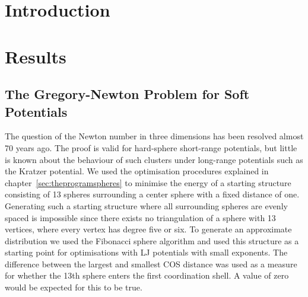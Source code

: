 \section{Introduction}
\label{sec:introductiongregorynewton}

\section{Results}
\label{sec:resultsgregorynewton}

\subsection{The Gregory-Newton Problem for Soft Potentials}
\label{sec:thegregorynewtonproblemforsoftpotentials}

The question of the Newton number in three dimensions has been resolved almost
70 years ago\autocite{Schutte_ProblemdreizehnKugeln_1952}. The proof is valid for hard-sphere
short-range potentials, but little is known about the behaviour of such
clusters under long-range potentials such as the Kratzer
potential\autocite{Kratzer_ultrarotenRotationsspektrenHalogenwasserstoffe_1920}. We used the optimisation
procedures explained in chapter~\ref{sec:theprogramspheres} to minimise the
energy of a starting structure consisting of 13 spheres surrounding a center
sphere with a fixed distance of one. Generating such a starting structure where
all surrounding spheres are evenly spaced is impossible since there exists no
triangulation of a sphere with 13 vertices, where every vertex has degree five
or six\autocite{Schwerdtfeger_topologyfullerenes_2015}. To generate an approximate
distribution we used the Fibonacci sphere
algorithm\autocite{Gonzalez_MeasurementAreasSphere_2010,Keinert_SphericalFibonacciMapping_2015} and used
this structure as a starting point for optimisations with \ac{LJ} potentials
with small exponents. The difference between the largest and smallest \ac{COS}
distance was used as a measure for whether the 13th sphere enters the first
coordination shell. A value of zero would be expected for this to be true.

